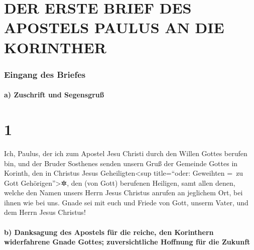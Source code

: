 \hypertarget{der-erste-brief-des-apostels-paulus-an-die-korinther}{%
\section{DER ERSTE BRIEF DES APOSTELS PAULUS AN DIE
KORINTHER}\label{der-erste-brief-des-apostels-paulus-an-die-korinther}}

\hypertarget{eingang-des-briefes}{%
\subsubsection{Eingang des Briefes}\label{eingang-des-briefes}}

\hypertarget{a-zuschrift-und-segensgruuxdf}{%
\paragraph{a) Zuschrift und
Segensgruß}\label{a-zuschrift-und-segensgruuxdf}}

\hypertarget{section}{%
\section{1}\label{section}}

 Ich, Paulus, der ich zum Apostel Jesu Christi durch den
Willen Gottes berufen bin, und der Bruder Sosthenes 
senden unsern Gruß der Gemeinde Gottes in Korinth, den in Christus Jesus
Geheiligten\textless sup title=``oder: Geweihten =~zu Gott
Gehörigen''\textgreater✲, den (von Gott) berufenen Heiligen, samt allen
denen, welche den Namen unsers Herrn Jesus Christus anrufen an jeglichem
Ort, bei ihnen wie bei uns.  Gnade sei mit euch und Friede
von Gott, unserm Vater, und dem Herrn Jesus Christus!

\hypertarget{b-danksagung-des-apostels-fuxfcr-die-reiche-den-korinthern-widerfahrene-gnade-gottes-zuversichtliche-hoffnung-fuxfcr-die-zukunft}{%
\paragraph{b) Danksagung des Apostels für die reiche, den Korinthern
widerfahrene Gnade Gottes; zuversichtliche Hoffnung für die
Zukunft}\label{b-danksagung-des-apostels-fuxfcr-die-reiche-den-korinthern-widerfahrene-gnade-gottes-zuversichtliche-hoffnung-fuxfcr-die-zukunft}}

